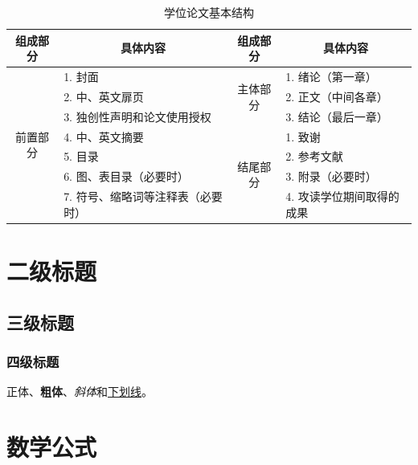 \begin{table}[htbp]
    \centering
    \caption{学位论文基本结构}
    \label{tab:thesis-structure}
    \begin{tabular}{@{}clcl@{}}
          \toprule
          组成部分 & \multicolumn{1}{c}{具体内容} & 组成部分 & \multicolumn{1}{c}{具体内容} \\
          \midrule
          \multirow{7}{*}{前置部分}
              & 1. 封面
              & \multirow{3}{*}{主体部分}
              & 1. 绪论（第一章） \\
              & 2. 中、英文扉页
              &
              & 2. 正文（中间各章） \\
              & 3. 独创性声明和论文使用授权
              &
              & 3. 结论（最后一章） \\
          \cmidrule(lr){3-4}
              & 4. 中、英文摘要
              & \multirow{4}{*}{结尾部分}
              & 1. 致谢 \\
              & 5. 目录
              &
              & 2. 参考文献 \\
              & 6. 图、表目录（必要时）
              &
              & 3. 附录（必要时） \\
              & 7. 符号、缩略词等注释表（必要时）
              &
              & 4. 攻读学位期间取得的成果 \\
          \bottomrule
    \end{tabular}
\end{table}

\section{二级标题}

\subsection{三级标题}

\subsubsection{四级标题}

正体、\textbf{粗体}、\textit{斜体}和\underline{下划线}。

\section{数学公式}

